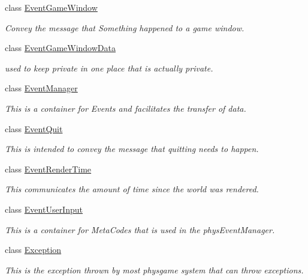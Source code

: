 \begin{DoxyCompactItemize}
class \hyperlink{classphys_1_1EventGameWindow}{EventGameWindow}
\begin{DoxyCompactList}\small\item\em Convey the message that Something happened to a game window. \item\end{DoxyCompactList}\item 
class \hyperlink{classphys_1_1EventGameWindowData}{EventGameWindowData}
\begin{DoxyCompactList}\small\item\em used to keep private in one place that is actually private. \item\end{DoxyCompactList}\item 
class \hyperlink{classphys_1_1EventManager}{EventManager}
\begin{DoxyCompactList}\small\item\em This is a container for Events and facilitates the transfer of data. \item\end{DoxyCompactList}\item 
class \hyperlink{classphys_1_1EventQuit}{EventQuit}
\begin{DoxyCompactList}\small\item\em This is intended to convey the message that quitting needs to happen. \item\end{DoxyCompactList}\item 
class \hyperlink{classphys_1_1EventRenderTime}{EventRenderTime}
\begin{DoxyCompactList}\small\item\em This communicates the amount of time since the world was rendered. \item\end{DoxyCompactList}\item 
class \hyperlink{classphys_1_1EventUserInput}{EventUserInput}
\begin{DoxyCompactList}\small\item\em This is a container for MetaCodes that is used in the physEventManager. \item\end{DoxyCompactList}\item 
class \hyperlink{classphys_1_1Exception}{Exception}
\begin{DoxyCompactList}\small\item\em This is the exception thrown by most physgame system that can throw exceptions. \item\end{DoxyCompactList}\item 

\end{DoxyCompactItemize}

